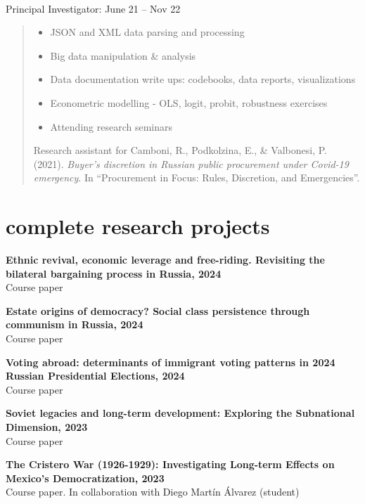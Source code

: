 \documentclass[12pt]{article}
\newcommand{\entry}[4]{{{\textbf{#1}}} \hfill #3 \\ #2 \hfill #4}
\begin{document}
\smallskip

\entry{\href{https://cinst.hse.ru/en/pprocurement/}{\color{blue-violet}{Economics of Public Procurement}}}{Principal Investigator: \href{https://www.hse.ru/en/staff/epodkolzina}{\color{blue-violet}{Elena Podkolzina}}}{}{June 21 -- Nov 22}

\begin{quote}
\begin{itemize}[noitemsep,leftmargin=3.5mm,rightmargin=0mm,topsep=6pt]
  \item JSON and XML data parsing and processing
  \item Big data manipulation \& analysis
  \item Data documentation write ups: codebooks, data reports, visualizations
  \item Econometric modelling - OLS, logit, probit, robustness exercises
  \item Attending research seminars
\end{itemize}

\raggedright
Research assistant for Camboni, R., Podkolzina, E., \& Valbonesi, P. (2021). \textit{Buyer’s discretion in Russian public procurement under Covid-19 emergency}. In ``Procurement in Focus: Rules, Discretion, and Emergencies''.
\end{quote}

\section{complete research projects}

\newpage

\entry{Ethnic revival, economic leverage and free-riding. Revisiting the bilateral bargaining process in Russia, 2024}{Course paper}{}{}

\smallskip

\entry{Estate origins of democracy? Social class persistence through communism in Russia, 2024}{Course paper}{}{}

\smallskip

\entry{Voting abroad: determinants of immigrant voting patterns in 2024 Russian Presidential Elections, 2024}{Course paper}{}{}

\smallskip

\entry{Soviet legacies and long-term development: Exploring the Subnational Dimension, 2023}{Course paper}{}{}

\smallskip

\entry{The Cristero War (1926-1929): Investigating Long-term Effects on Mexico's Democratization, 2023}{Course paper. In collaboration with Diego Martín Álvarez (student)}{}{}
\end{document}
